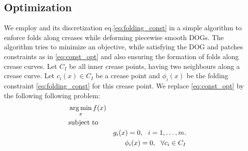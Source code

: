 \subsection{Optimization}
We employ  and its discretization eq.\eqref{eq:folding_const} in a simple algorithm to enforce folds along creases while deforming piecewise smooth DOGs. The algorithm tries to minimize an objective, while satisfying the DOG and patches constraints as in \eqref{eq:const_opt} and also ensuring the formation of folds along crease curves. Let $C_{I}$ be all inner crease points, having two neighbours along a crease curve. Let $c_i(x) \in C_{I}$ be a crease point and $\phi_i(x) $ be the folding constraint \eqref{eq:folding_const} for this crease point. We replace \eqref{eq:const_opt} by the following following problem:
\begin{equation} \label{eq:const_opt}
\begin{aligned}
& \operatorname*{arg\,min}_x
f(x) \\
& \textrm{subject to} \\
& & g_i(x) = 0, \ \  i = 1, \ldots, m. \\
& & \phi_i(x) = 0, \ \  \forall c_i \in C_{I}
\end{aligned}
\end{equation}

